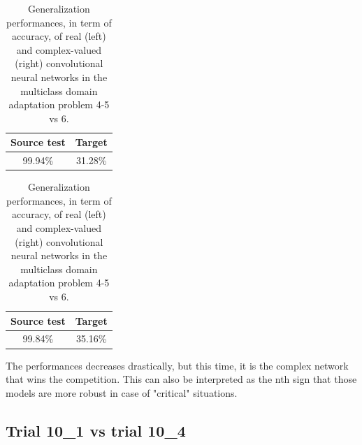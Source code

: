 \documentclass[../main.tex]{subfiles}
\begin{document}
\begin{table}[!ht]
	\centering
	\begin{minipage}{.45\linewidth}
		\begin{tabular}{c c}
			\textbf{Source test} & \textbf{Target}\\
			\midrule
			99.94\% & 31.28\% \\			
		\end{tabular}
	\end{minipage}
	\begin{minipage}{.45\linewidth}
		\begin{tabular}{c c}
			\textbf{Source test} & \textbf{Target}\\
			\midrule
			99.84\% & 35.16\% \\			
		\end{tabular}
	\end{minipage}
	\caption{Generalization performances, in term of accuracy, of real (left) and complex-valued (right) convolutional neural networks in the multiclass domain adaptation problem 4-5 vs 6.}
	\label{tab:bonfiglioli_multiclass_generalization_456}
\end{table}
The performances decreases drastically, but this time, it is the complex network that wins the competition. This can also be interpreted as the nth sign that those models are more robust in case of "critical" situations.\\



\subsection*{Trial 10\_1 vs trial 10\_4}
\end{document}
